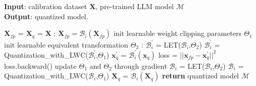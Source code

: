 \documentclass{article} %
\begin{document}
\begin{algorithm}[!ht]
\caption{Overall algorithm of OmniQuant.}\label{alg:omniquant}
\textbf{Input}: calibration dataset $\mathbf{X}$, pre-trained LLM model $\mathcal{M}$  \\
\textbf{Output}: quantized model.
\begin{algorithmic}[1]
\State $\mathbf{X}_{fp}$ = $\mathbf{X}_{q}$ = $\mathbf{X}$  
:  
\State $\mathbf{X}_{fp} = \mathcal{B}_i(\mathbf{X}_{fp})$ 
\State init learnable weight clipping parameters $\Theta_1$
\State init learnable equivalent transformation $\Theta_2$
:
\State $\mathcal{B}_i^{'}$ = LET($\mathcal{B}_i$,$\Theta_2$) 
\State $\mathcal{B}_i^{'}$ = Quantization\_with\_LWC($\mathcal{B}_i^{'}$,$\Theta_1$)
\State $\mathbf{x}_{q}^{'}$ = $\mathcal{B}_i^{'}(\mathbf{x}_{q})$
\State loss = $\lvert\lvert \mathbf{x}_{fp} -\mathbf{x}_{q}^{'} \rvert\rvert^{2}$ 
\State loss.backward()
\State update $\Theta_1$ and $\Theta_2$ through gradient
\EndFor
\EndFor
\State $\mathcal{B}_i$ = LET($\mathcal{B}_i$,$\Theta_2$) 
\State $\mathcal{B}_i$ = Quantization\_with\_LWC($\mathcal{B}_i$,$\Theta_1$) 
\State $\mathbf{X}_q$ = $\mathcal{B}_i(\mathbf{X}_q)$ 
\EndFor
\State \textbf{return} quantized model $\mathcal{M}$
\end{algorithmic}
\end{algorithm}
\end{document}
